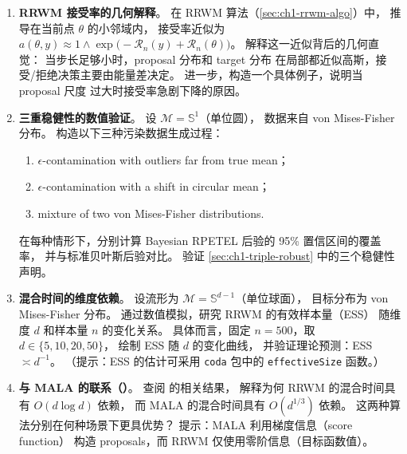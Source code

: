 \begin{enumerate}
    \item\textbf{RRWM 接受率的几何解释}。
          在 RRWM 算法（\cref{sec:ch1-rrwm-algo}）中，
          推导在当前点 $\theta$ 的小邻域内，
          接受率近似为
          $a(\theta,y)\approx 1\wedge
           \exp\!\big(-\mathcal{R}_n(y)+\mathcal{R}_n(\theta)\big)$。
          解释这一近似背后的几何直觉：
          当步长足够小时，proposal 分布和 target 分布
          在局部都近似高斯，接受/拒绝决策主要由能量差决定。
          进一步，构造一个具体例子，说明当 proposal 尺度
          过大时接受率急剧下降的原因。

    \item\textbf{三重稳健性的数值验证}。
          设 $\mathcal{M}=\mathbb{S}^1$（单位圆），
          数据来自 von Mises-Fisher 分布。
          构造以下三种污染数据生成过程：
          \begin{enumerate}
              \item[(a)] $\epsilon$-contamination with outliers far from true mean；
              \item[(b)] $\epsilon$-contamination with a shift in circular mean；
              \item[(c)] mixture of two von Mises-Fisher distributions.
          \end{enumerate}
          在每种情形下，分别计算 Bayesian RPETEL 后验的
          95\% 置信区间的覆盖率，
          并与标准贝叶斯后验对比。
          验证 \cref{sec:ch1-triple-robust} 中的三个稳健性声明。

    \item\textbf{混合时间的维度依赖}。
          设流形为 $\mathcal{M}=\mathbb{S}^{d-1}$（单位球面），
          目标分布为 von Mises-Fisher 分布。
          通过数值模拟，研究 RRWM 的有效样本量（ESS）
          随维度 $d$ 和样本量 $n$ 的变化关系。
          具体而言，固定 $n=500$，取 $d\in\{5,10,20,50\}$，
          绘制 ESS 随 $d$ 的变化曲线，
          并验证理论预测：ESS $\asymp d^{-1}$。
          （提示：ESS 的估计可采用 \texttt{coda} 包中的 \texttt{effectiveSize} 函数。）

    \item\textbf{与 MALA 的联系（\citep{tang2024mala}）}。
          查阅 \citep{tang2024mala} 的相关结果，
          解释为何 RRWM 的混合时间具有 $O(d\log d)$ 依赖，
          而 MALA 的混合时间具有 $O(d^{1/3})$ 依赖。
          这两种算法分别在何种场景下更具优势？
          提示：MALA 利用梯度信息（score function）
          构造 proposals，而 RRWM 仅使用零阶信息（目标函数值）。

\end{enumerate}
